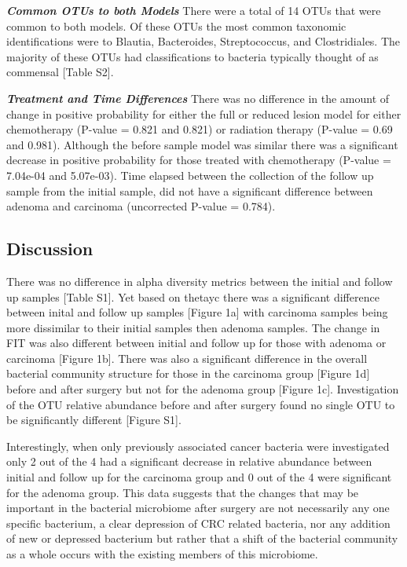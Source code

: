 \documentclass[12pt,]{article}
\begin{document}
\textbf{\emph{Common OTUs to both Models}} There were a total of 14 OTUs
that were common to both models. Of these OTUs the most common taxonomic
identifications were to Blautia, Bacteroides, Streptococcus, and
Clostridiales. The majority of these OTUs had classifications to
bacteria typically thought of as commensal {[}Table S2{]}.

\textbf{\emph{Treatment and Time Differences}} There was no difference
in the amount of change in positive probability for either the full or
reduced lesion model for either chemotherapy (P-value = 0.821 and 0.821)
or radiation therapy (P-value = 0.69 and 0.981). Although the before
sample model was similar there was a significant decrease in positive
probability for those treated with chemotherapy (P-value = 7.04e-04 and
5.07e-03). Time elapsed between the collection of the follow up sample
from the initial sample, did not have a significant difference between
adenoma and carcinoma (uncorrected P-value = 0.784).

\newpage

\subsection{Discussion}\label{discussion}

There was no difference in alpha diversity metrics between the initial
and follow up samples {[}Table S1{]}. Yet based on thetayc there was a
significant difference between inital and follow up samples {[}Figure
1a{]} with carcinoma samples being more dissimilar to their initial
samples then adenoma samples. The change in FIT was also different
between initial and follow up for those with adenoma or carcinoma
{[}Figure 1b{]}. There was also a significant difference in the overall
bacterial community structure for those in the carcinoma group {[}Figure
1d{]} before and after surgery but not for the adenoma group {[}Figure
1c{]}. Investigation of the OTU relative abundance before and after
surgery found no single OTU to be significantly different {[}Figure
S1{]}.

Interestingly, when only previously associated cancer bacteria were
investigated only 2 out of the 4 had a significant decrease in relative
abundance between initial and follow up for the carcinoma group and 0
out of the 4 were significant for the adenoma group. This data suggests
that the changes that may be important in the bacterial microbiome after
surgery are not necessarily any one specific bacterium, a clear
depression of CRC related bacteria, nor any addition of new or depressed
bacterium but rather that a shift of the bacterial community as a whole
occurs with the existing members of this microbiome.
\end{document}
